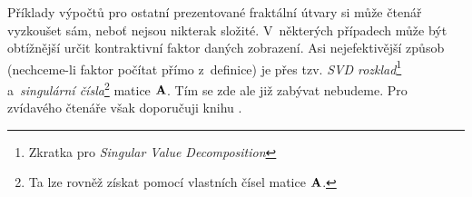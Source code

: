 Příklady výpočtů pro ostatní prezentované fraktální útvary si může čtenář vyzkoušet sám, neboť nejsou nikterak složité. V~některých případech může být obtížnější určit kontraktivní faktor daných zobrazení. Asi nejefektivější způsob (nechceme-li faktor počítat přímo z~definice) je přes tzv. \emph{SVD rozklad}\footnote{Zkratka pro \emph{Singular Value Decomposition}} a~\emph{singulární čísla}\footnote{Ta lze rovněž získat pomocí vlastních čísel matice $\mathbf{A}$.} matice $\mathbf{A}$. Tím se zde ale již zabývat nebudeme. Pro zvídavého čtenáře však doporučuji knihu \cite{Hladik2019}.